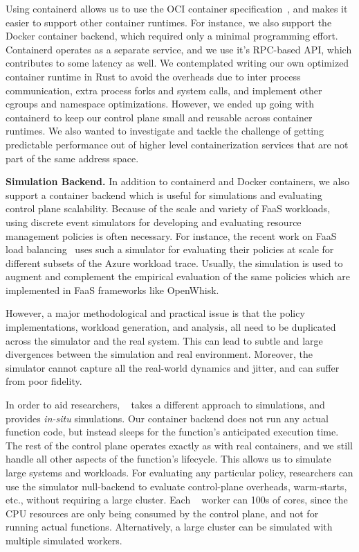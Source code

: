 Using containerd allows us to use the OCI container specification~\cite{oci}, and makes it easier to support other container runtimes.
For instance, we also support the Docker container backend, which required only a minimal programming effort.
Containerd operates as a separate service, and we use it's RPC-based API, which contributes to some latency as well.
We contemplated writing our own optimized container runtime in Rust to avoid the overheads due to inter process communication, extra process forks and system calls, and implement other cgroups and namespace optimizations. 
However, we ended up going with containerd to keep our control plane small and reusable across container runtimes.
We also wanted to investigate and tackle the challenge of getting predictable performance out of higher level containerization services that are not part of the same address space. 


\noindent \textbf{Simulation Backend.}
In addition to containerd and Docker containers, we also support a  container backend which is useful for simulations and evaluating control plane scalability.
%
Because of the scale and variety of FaaS workloads, using discrete event simulators for developing and evaluating resource management policies is often necessary.
%
For instance, the recent work on FaaS load balancing~\cite{faaslb-hpdc22} uses such a simulator for evaluating their policies at scale for different subsets of the Azure workload trace.
Usually, the simulation is used to augment and complement the  empirical evaluation of the same policies which are implemented in FaaS frameworks like OpenWhisk. 

However, a major methodological and practical issue is that the policy implementations, workload generation, and analysis, all need to be duplicated across the simulator and the real system.
This can lead to subtle and large divergences between the simulation and real environment. 
Moreover, the simulator cannot capture all the real-world dynamics and jitter, and can suffer from poor fidelity.

In order to aid researchers, \sysname~ takes a different approach to simulations, and provides \emph{in-situ} simulations. 
Our  container backend does not run any actual function code, but instead sleeps for the function's anticipated execution time.
The rest of the control plane operates exactly as with real containers, and we still handle all other aspects of the function's lifecycle.
%
This allows us to simulate large systems and workloads. 
For evaluating any particular policy, researchers can use the simulator null-backend to evaluate control-plane overheads, warm-starts, etc., without requiring a large cluster.
Each \sysname~ worker can  100s of cores, since the CPU resources are only being consumed by the control plane, and not for running actual functions.
Alternatively, a large cluster can be simulated with multiple simulated workers. 

